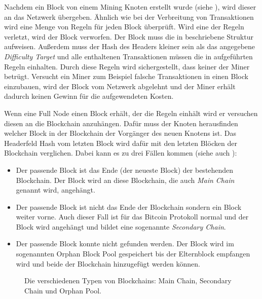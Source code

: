 \documentclass[ngerman,runningheads,a4paper]{llncs}[2018/03/10]
\begin{document}
Nachdem ein Block von einem Mining Knoten erstellt wurde (siehe ), wird dieser an das Netzwerk übergeben. Ähnlich wie bei der Verbreitung von Transaktionen wird eine Menge von Regeln für jeden Block überprüft. Wird eine der Regeln verletzt, wird der Block verworfen. Der Block muss die in  beschriebene Struktur aufweisen. Außerdem muss der Hash des Headers kleiner sein als das angegebene \textit{Difficulty Target} und alle enthaltenen Transaktionen müssen die in  aufgeführten Regeln einhalten. Durch diese Regeln wird sichergestellt, dass keiner der Miner betrügt. Versucht ein Miner zum Beispiel falsche Transaktionen in einen Block einzubauen, wird der Block vom Netzwerk abgelehnt und der Miner erhält dadurch keinen Gewinn für die aufgewendeten Kosten.

Wenn eine Full Node einen Block erhält, der die Regeln einhält wird er versuchen diesen an die Blockchain anzuhängen. Dafür muss der Knoten herausfinden welcher Block in der Blockchain der Vorgänger des neuen Knotens ist. Das Headerfeld Hash vom letzten Block wird dafür mit den letzten Blöcken der Blockchain verglichen. Dabei kann es zu drei Fällen kommen (siehe auch ):

\begin{itemize}

\item Der passende Block ist das Ende (der neueste Block) der bestehenden Blockchain. Der Block wird an diese Blockchain, die auch \textit{Main Chain} genannt wird, angehängt.

\item Der passende Block ist nicht das Ende der Blockchain sondern ein Block weiter vorne. Auch dieser Fall ist für das Bitcoin Protokoll normal und der Block wird angehängt und bildet eine sogenannte \textit{Secondary Chain}.

\item Der passende Block konnte nicht gefunden werden. Der Block wird im sogenannten Orphan Block Pool gespeichert bis der Elternblock empfangen wird und beide der Blockchain hinzugefügt werden können.

\end{itemize}

\begin{figure}
  \centering
  \caption{Die verschiedenen Typen von Blockchains: Main Chain, Secondary Chain und Orphan Pool.}
  \label{fig:blockchainTypes}
\end{figure}
\end{document}
